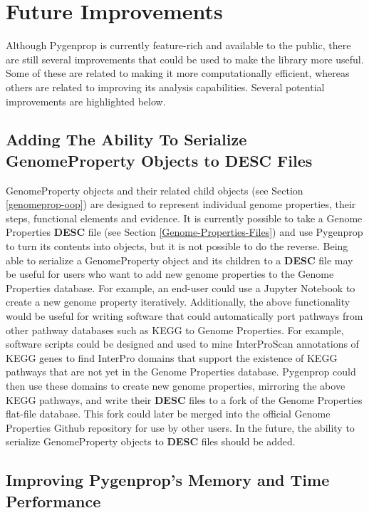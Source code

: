 \section{Future Improvements}

Although Pygenprop is currently feature-rich and available to the public, there are still several improvements that could be used to make the library more useful. Some of these are related to making it more computationally efficient, whereas others are related to improving its analysis capabilities. Several potential improvements are highlighted below.

\subsection{Adding The Ability To Serialize GenomeProperty Objects to DESC Files}

GenomeProperty objects and their related child objects (see Section \ref{genomeprop-oop}) are designed to represent individual genome properties, their steps, functional elements and evidence. It is currently possible to take a Genome Properties \textbf{DESC} file (see Section \ref{Genome-Properties-Files}) and use Pygenprop to turn its contents into objects, but it is not possible to do the reverse. Being able to serialize a GenomeProperty object and its children to a \textbf{DESC} file may be useful for users who want to add new genome properties to the Genome Properties database. For example, an end-user could use a Jupyter Notebook \cite{kluyver2016jupyter} to create a new genome property iteratively. Additionally, the above functionality would be useful for writing software that could automatically port pathways from other pathway databases such as KEGG \cite{kanehisa2000kegg} to Genome Properties. For example, software scripts could be designed and used to mine InterProScan annotations of KEGG genes \cite{kanehisa2015kegg} to find InterPro domains that support the existence of KEGG pathways that are not yet in the Genome Properties database. Pygenprop could then use these domains to create new genome properties, mirroring the above KEGG pathways, and write their \textbf{DESC} files to a fork of the Genome Properties flat-file database. This fork could later be merged into the official Genome Properties Github repository for use by other users. In the future, the ability to serialize GenomeProperty objects to \textbf{DESC} files should be added.

\subsection{Improving Pygenprop's Memory and Time Performance}

